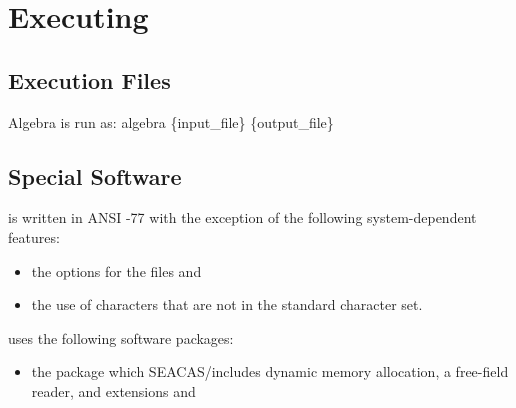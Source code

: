 \chapter{Executing \caps{\PROGRAM}} \label{chap:exec}

\section{Execution Files} \label{exec:files}

Algebra is run as: algebra \{input\_file\} \{output\_file\}

\section{Special Software}

\caps{\PROGRAM} is written in ANSI -77 \cite{bib:f77} with
the exception of the following system-dependent features:
\setlength{\itemsep}{\medskipamount} \begin{itemize}
\item the  options for the files and
\item the use of  characters that are not in the
 standard character set.
\end{itemize}

\caps{\PROGRAM} uses the following software packages:
\setlength{\itemsep}{\medskipamount} \begin{itemize}
\item the  package \cite{bib:supes} which SEACAS/includes dynamic
memory allocation, a free-field reader, and  extensions
and
\end{itemize}
